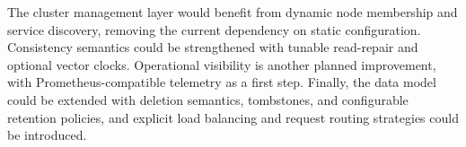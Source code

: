 \documentclass{scrartcl}
\begin{document}
The cluster management layer would benefit from dynamic node membership and service discovery, removing the current dependency on static configuration. Consistency semantics could be strengthened with tunable read-repair and optional vector clocks. Operational visibility is another planned improvement, with Prometheus-compatible telemetry as a first step. Finally, the data model could be extended with deletion semantics, tombstones, and configurable retention policies, and explicit load balancing and request routing strategies could be introduced.


\nocite{*}

\end{document}
